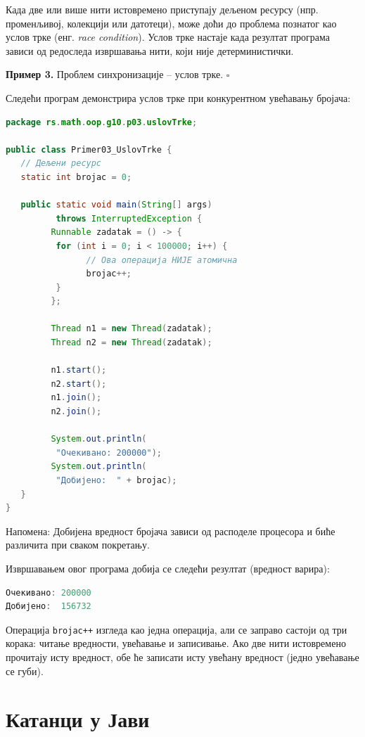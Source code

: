 Када две или више нити истовремено приступају дељеном ресурсу (нпр. променљивој, колекцији или датотеци), може доћи до проблема познатог као услов трке (енг. \textit{race condition}). Услов трке настаје када резултат програма зависи од редоследа извршавања нити, који није детерминистички.


\bigskip

\noindent \textbf{Пример 3.} Проблем синхронизације – услов трке. $\square$

\medskip

Следећи програм демонстрира услов трке при конкурентном увећавању бројача:


\begin{lstlisting}[language=Java]
package rs.math.oop.g10.p03.uslovTrke;
 
public class Primer03_UslovTrke {
   // Дељени ресурс
   static int brojac = 0;
 
   public static void main(String[] args)
          throws InterruptedException {
         Runnable zadatak = () -> {
          for (int i = 0; i < 100000; i++) {
                // Ова операција НИЈЕ атомична
                brojac++;
          }
         };
 
         Thread n1 = new Thread(zadatak);
         Thread n2 = new Thread(zadatak);
 
         n1.start();
         n2.start();
         n1.join();
         n2.join();
 
         System.out.println(
          "Очекивано: 200000");
         System.out.println(
          "Добијено:  " + brojac);
   }
}
\end{lstlisting}


Напомена: Добијена вредност бројача зависи од расподеле процесора и биће различита при сваком покретању.

Извршавањем овог програма добија се следећи резултат (вредност варира):


\begin{lstlisting}[language=Java]
Очекивано: 200000
Добијено:  156732
\end{lstlisting}


Операција \texttt{brojac++} изгледа као једна операција, али се заправо састоји од три корака: читање вредности, увећавање и записивање. Ако две нити истовремено прочитају исту вредност, обе ће записати исту увећану вредност (једно увећавање се губи).


\section{Катанци у Јави}

